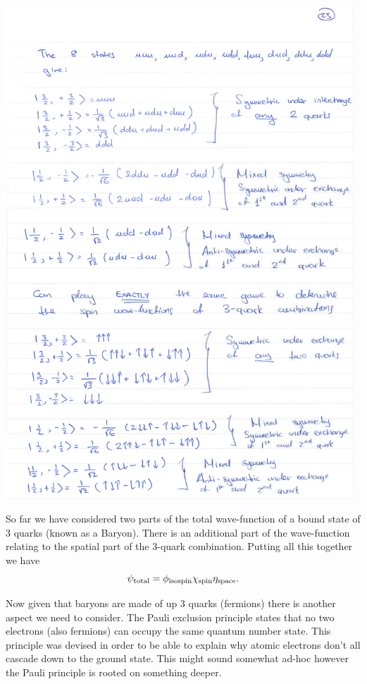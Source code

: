 \begin{center}
\includegraphics[width=0.98\textwidth]{fig/strongforce/baryon_spin.pdf}
\end{center}

So far we have considered two parts of the total wave-function of a bound state of 3 quarks (known as a Baryon). There is an additional part of the wave-function relating to the spatial part of the 3-quark combination. Putting all this together we have
\begin{equation}
\label{eq:psi_total_no_colour}
\psi_{\rm total}=\phi_{\rm isospin}\chi_{\rm spin}\eta_{\rm space}.
\end{equation}

Now given that baryons are made of up 3 quarks (fermions) there is another aspect we need to consider. The Pauli exclusion principle states that no two electrons (also fermions) can occupy the same quantum number state. This principle was devised in order to be able to explain why atomic electrons don't all cascade down to the ground state. This might sound somewhat ad-hoc however the Pauli principle is rooted on something deeper. 

